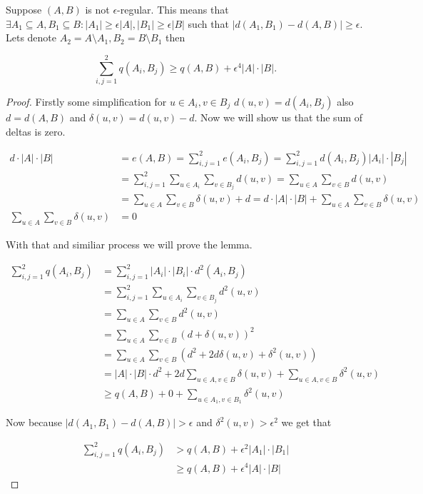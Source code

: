 \begin{lemma}
	Suppose $(A,B)$ is not $\epsilon$-regular. This means that $\exists A_1 \subseteq A, B_1 \subseteq B : |A_1| \geq \epsilon |A|, |B_1| \geq \epsilon |B|$ such that $|d(A_1, B_1) - d(A,B)| \geq \epsilon$. Lets denote $A_2 = A \setminus A_1, B_2 = B \setminus B_1$ then
	
	$$
	\sum_{i,j = 1}^2 q(A_i,B_j) \geq q(A,B) + \epsilon^4 |A| \cdot |B|.
	$$
\end{lemma}

\begin{proof}
	Firstly some simplification for $u \in A_i, v \in B_j$ $d(u,v) = d(A_i, B_j)$ also $d = d(A,B)$ and $\delta (u,v) = d(u,v) - d$. Now we will show us that the sum of deltas is zero.
	
	$$
	\begin{aligned}
		d \cdot |A| \cdot |B| &= e(A,B) = \sum_{i,j = 1}^2 e(A_i, B_j) = \sum_{i,j = 1}^2 d(A_i, B_j) |A_i| \cdot |B_j| \\
		&= \sum_{i,j = 1}^2 \sum_{u \in A_i} \sum_{v \in B_j} d(u,v) = \sum_{u \in A} \sum_{v \in B} d(u,v) \\
		&= \sum_{u \in A} \sum_{v \in B} \delta(u,v) + d = d \cdot |A| \cdot |B| + \sum_{u \in A} \sum_{v \in B} \delta(u,v)\\
		\sum_{u \in A} \sum_{v \in B} \delta(u,v) &= 0
	\end{aligned}
	$$
	
	With that and similiar process we will prove the lemma.
	
	$$
	\begin{aligned}
		\sum_{i,j = 1}^2 q(A_i, B_j) &= \sum_{i,j = 1}^2 |A_i| \cdot |B_i| \cdot d^2(A_i, B_j) \\
		&= \sum_{i,j = 1}^2 \sum_{u \in A_i} \sum_{v \in B_j} d^2(u,v) \\
		&= \sum_{u \in A} \sum_{v \in B} d^2(u,v)\\
		&= \sum_{u \in A} \sum_{v \in B} (d + \delta(u,v))^2\\
		&= \sum_{u \in A} \sum_{v \in B} (d^2 + 2d \delta(u,v) + \delta^2(u,v))\\
		&= |A| \cdot |B| \cdot d^2 + 2d \sum_{u \in A, v \in B} \delta(u,v) + \sum_{u \in A, v \in B} \delta^2(u,v)\\
		&\geq q(A,B) + 0 + \sum_{u \in A_1, v \in B_1} \delta^2(u,v)
	\end{aligned}
	$$
	
	Now because $|d(A_1, B_1) - d(A,B)| > \epsilon$ and $\delta^2(u,v) > \epsilon^2$ we get that
	
	$$
	\begin{aligned}
		\sum_{i,j = 1}^2 q(A_i, B_j) &> q(A,B) + \epsilon^2 |A_1| \cdot |B_1|\\
		&\geq q(A,B) + \epsilon^4 |A| \cdot |B|
	\end{aligned}
	$$
\end{proof}

